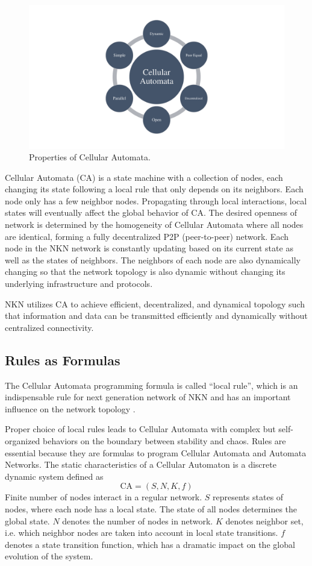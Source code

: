 \documentclass[reprint,pre,aps]{revtex4-1}
\begin{document}
\begin{figure}[!htp]
\centering
\includegraphics[width=0.7\linewidth]{fig/ca_properties}
\caption{Properties of Cellular Automata.}
\label{fig:ca_properties}
\end{figure}

Cellular Automata (CA) is a state machine with a collection of nodes, each changing its state following a local rule that only depends on its neighbors. Each node only has a few neighbor nodes. Propagating through local interactions, local states will eventually affect the global behavior of CA. The desired openness of network is determined by the homogeneity of Cellular Automata where all nodes are identical, forming a fully decentralized P2P (peer-to-peer) network. Each node in the NKN network is constantly updating based on its current state as well as the states of neighbors. The neighbors of each node are also dynamically changing so that the network topology is also dynamic without changing its underlying infrastructure and protocols.

NKN utilizes CA to achieve efficient, decentralized, and dynamical topology such that information and data can be transmitted efficiently and dynamically without centralized connectivity.

\subsection{Rules as Formulas}

The Cellular Automata programming formula is called ``local rule'', which is an indispensable rule for next generation network of NKN and has an important influence on the network topology \cite{wolfram2002new, yang2007cellular, marr2007regularizing, chung2001diameter, saghiri2017closed}.

Proper choice of local rules leads to Cellular Automata with complex but self-organized behaviors on the boundary between stability and chaos. Rules are essential because they are formulas to program Cellular Automata and Automata Networks. 
The static characteristics of a Cellular Automaton is a discrete dynamic system defined as
\begin{equation}
\text{CA} = (S,N,K,f)
\end{equation}
Finite number of nodes interact in a regular network. $S$ represents states of nodes, where each node has a local state. The state of all nodes determines the global state. $N$ denotes the number of nodes in network. $K$ denotes neighbor set, i.e. which neighbor nodes are taken into account in local state transitions. $f$ denotes a state transition function, which has a dramatic impact on the global evolution of the system.
\end{document}

